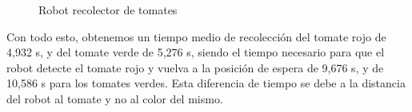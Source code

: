 \begin{figure}[H]
    \begin{center}
      \subcapcentertrue
      \hspace{2mm}
    \end{center}
    \caption{Robot recolector de tomates}
    \label{fig:Robots_tomates}
\end{figure}

Con todo esto, obtenemos un tiempo medio de recolección del tomate rojo de 4,932 s, y del tomate verde de 5,276 s, siendo el tiempo necesario para que el robot detecte el tomate rojo y vuelva a la posición de espera de 9,676 s, y de 10,586 s para los tomates verdes. Esta diferencia de tiempo se debe a la distancia del robot al tomate y no al color del mismo.







